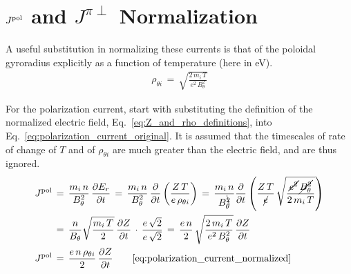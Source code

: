 \chapter{\texorpdfstring{$J^\textnormal{pol}$}{J pol} and \texorpdfstring{$J^{\pi\perp}$}{J bulk} Normalization}\label{chapter:Normalization}
A useful substitution in normalizing these currents is that of the poloidal gyroradius explicitly as a function of temperature (here in eV).
\begin{align} %
	\rho_{\theta i} \,=\, \sqrt{\frac{2 \, m_i \, T}{e^2 \, B_\theta^2}}
\end{align}

For the polarization current, start with substituting the definition of the normalized electric field, Eq.~\ref{eq:Z_and_rho_definitions}, into Eq.~\ref{eq:polarization_current_original}.
It is assumed that the timescales of rate of change of $T$ and of $\rho_{\theta i}$ are much greater than the electric field, and are thus ignored.
\begin{align} %
	J^\text{pol} \,&=\, \frac{m_i\,n}{B_\theta^2}\, \frac{\partial E_r}{\partial t}
		\,=\, \frac{m_i \, n}{B_\theta^2} \, \frac{\partial}{\partial t}
		\left(\frac{Z \, T}{e \, \rho_{\theta i}}\right)
		\,=\, \frac{m_i \, n}{B_\theta^{\bcancel{2}}} \frac{\partial}{\partial t}
		\left(\frac{Z \, T}{\cancel{e}} \, \sqrt{\frac{\cancel{e^2} \,
		\cancel{B_\theta^2}}{2 \, m_i \, T}} \right) \\
	&=\, \frac{n}{B_\theta} \sqrt{\frac{m_i \, T}{2}} \,
		\frac{\partial Z}{\partial t} \,\cdot\, \frac{e\,\sqrt{2}}{e\,\sqrt{2}}
		\,=\, \frac{e\,n}{2} \, \sqrt{\frac{2 \, m_i \, T}{e^2 \, B_\theta^2}}
		\, \frac{\partial Z}{\partial t} \\
	J^\text{pol} \,&=\, \frac{e \, n \, \rho_{\theta i}}{2} \,
		\frac{\partial Z}{\partial t}
		\tag*{\eqref{eq:polarization_current_normalized}}
\end{align}


